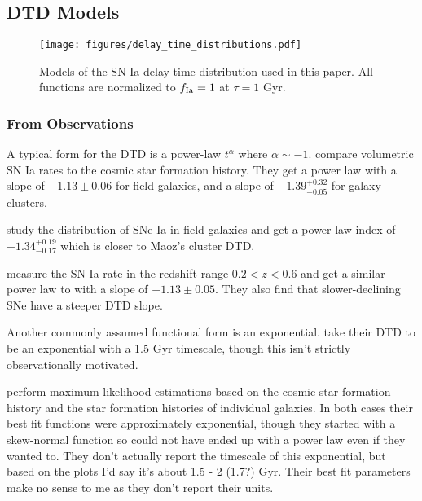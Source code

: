 \documentclass[twocolumn,linenumbers,twocolappendix]{aastex631}
\begin{document}
\subsection{DTD Models}
\label{sec:dtd-models}

\begin{figure}
    \centering
    \texttt{[image: figures/delay\_time\_distributions.pdf]}
    \caption{Models of the SN Ia delay time distribution used in this paper. All functions are normalized to $f_{\rm Ia}=1$ at $\tau=1$ Gyr.}
    \label{fig:dtds}
\end{figure}

\subsubsection{From Observations}

\citet{Maoz2014-Review}

A typical form for the DTD is a power-law $t^\alpha$ where $\alpha\sim-1$. \citet{Maoz2017-CosmicDTD} compare volumetric SN Ia rates to the cosmic star formation history. They get a power law with a slope of $-1.13\pm 0.06$ for field galaxies, and a slope of $-1.39^{+0.32}_{-0.05}$ for galaxy clusters.

\citet{Heringer2019-FieldGalaxyDTD} study the distribution of SNe Ia in field galaxies and get a power-law index of $-1.34^{+0.19}_{-0.17}$ which is closer to Maoz's cluster DTD.

\citet{Wiseman2021-DESRates} measure the SN Ia rate in the redshift range $0.2 < z < 0.6$ and get a similar power law to \citet{Maoz2017-CosmicDTD} with a slope of $-1.13 \pm 0.05$. They also find that slower-declining SNe have a steeper DTD slope.

Another commonly assumed functional form is an exponential. \citet{Schonrich2009-RadialMixing} take their DTD to be an exponential with a 1.5 Gyr timescale, though this isn't strictly observationally motivated.

\citet{Stolger2020-ExponentialDTD} perform maximum likelihood estimations based on the cosmic star formation history and the star formation histories of individual galaxies. In both cases their best fit functions were approximately exponential, though they started with a skew-normal function so could not have ended up with a power law even if they wanted to. They don't actually report the timescale of this exponential, but based on the plots I'd say it's about 1.5 - 2 (1.7?) Gyr. Their best fit parameters make no sense to me as they don't report their units.
\end{document}
